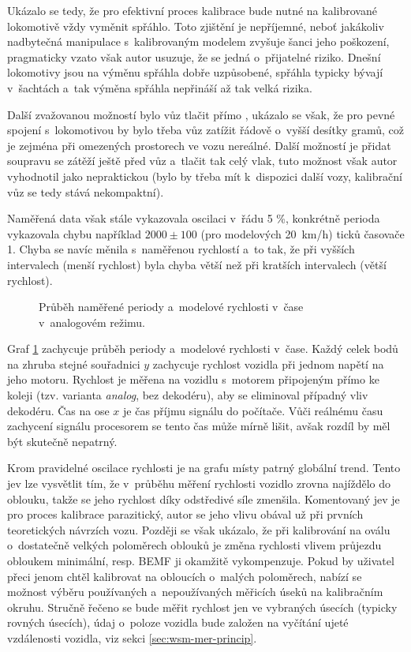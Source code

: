 Ukázalo se tedy, že pro efektivní proces kalibrace bude nutné na kalibrované
lokomotivě vždy vyměnit spřáhlo. Toto zjištění je nepříjemné, neboť
jakákoliv nadbytečná manipulace s~kalibrovaným modelem zvyšuje šanci jeho
poškození, pragmaticky vzato však autor usuzuje, že se jedná o~přijatelné
riziko. Dnešní lokomotivy jsou na výměnu spřáhla dobře uzpůsobené, spřáhla
typicky bývají v~šachtách a~tak výměna spřáhla nepřináší až tak velká rizika.

Další zvažovanou možností bylo vůz tlačit přímo ,
ukázalo se však, že pro pevné spojení s~lokomotivou by bylo třeba vůz zatížit
řádově o~vyšší desítky gramů, což je zejména při omezených prostorech ve vozu
nereálné. Další možností je přidat soupravu se zátěží ještě před vůz a~tlačit
tak celý vlak, tuto možnost však autor vyhodnotil jako nepraktickou (bylo by
třeba mít k~dispozici další vozy, kalibrační vůz se tedy stává nekompaktní).

Naměřená data však stále vykazovala oscilaci v~řádu 5 \%, konkrétně perioda
vykazovala chybu například $2000 \pm 100$ (pro modelových 20~km/h) ticků
časovače 1. Chyba se navíc měnila s~naměřenou rychlostí a~to tak, že při
vyšších intervalech (menší rychlost) byla chyba větší než při kratších
intervalech (větší rychlost).

\begin{figure}[h]

\caption{Průběh naměřené periody a~modelové rychlosti v~čase v~analogovém
režimu.}
\label{fig:speed-analog}
\end{figure}

Graf \ref{fig:speed-analog} zachycuje průběh periody a~modelové rychlosti
v~čase. Každý celek bodů na zhruba stejné souřadnici $y$ zachycuje rychlost
vozidla při jednom napětí na jeho motoru. Rychlost je měřena na vozidlu
s~motorem připojeným přímo ke koleji (tzv. varianta \textit{analog}, bez
dekodéru), aby se eliminoval případný vliv dekodéru. Čas na ose $x$ je čas
příjmu signálu do počítače. Vůči reálnému času zachycení signálu procesorem se
tento čas může mírně lišit, avšak rozdíl by měl být skutečně nepatrný.

Krom pravidelné oscilace rychlosti je na grafu místy patrný globální
 trend. Tento jev lze vysvětlit tím, že v~průběhu měření
rychlosti vozidlo zrovna najíždělo do oblouku, takže se jeho rychlost díky
odstředivé síle zmenšila. Komentovaný jev je pro proces kalibrace parazitický,
autor se jeho vlivu obával už při prvních teoretických návrzích vozu. Později
se však ukázalo, že při kalibrování na oválu o~dostatečně velkých poloměrech
oblouků je změna rychlosti vlivem průjezdu obloukem minimální, resp. BEMF ji
okamžitě vykompenzuje. Pokud by uživatel přeci jenom chtěl kalibrovat na
obloucích o~malých poloměrech, nabízí se možnost výběru používaných
a~nepoužívaných měřicích úseků na kalibračním okruhu. Stručně řečeno se bude
měřit rychlost jen ve vybraných úsecích (typicky rovných úsecích), údaj
o~poloze vozidla bude založen na vyčítání ujeté vzdálenosti vozidla, viz sekci
\ref{sec:wsm-mer-princip}.

